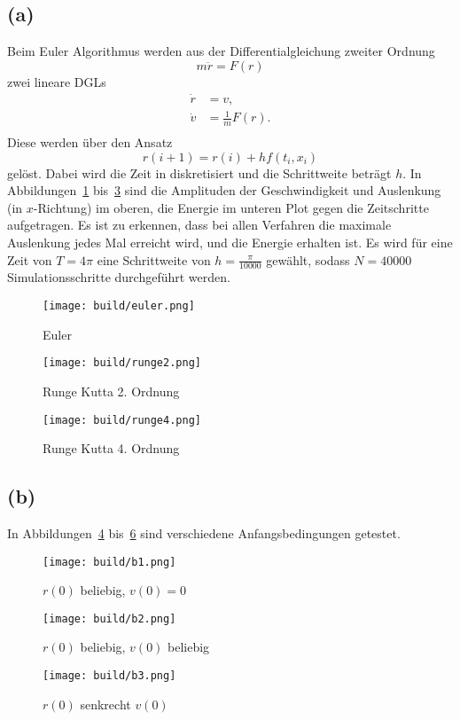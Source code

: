 \documentclass{scrartcl}
\begin{document}
\subsection*{(a)}
Beim Euler Algorithmus werden aus der Differentialgleichung zweiter Ordnung
\begin{equation}
  m \ddot{r} = F(r)
\end{equation}
zwei lineare DGLs
\begin{eqnarray}
  \dot{r} &= v,  \\
  \dot{v} &= \frac{1}{m} F(r). \\
\end{eqnarray}
Diese werden über den Ansatz
\begin{equation}
  r(i+1) = r(i) + h f(t_i, x_i)
\end{equation}
gelöst. Dabei wird die Zeit in diskretisiert und die Schrittweite
beträgt $h$.
In Abbildungen~\ref{fig:euler} bis~\ref{fig:rk4}
sind die Amplituden der Geschwindigkeit und Auslenkung (in $x$-Richtung) im oberen, die Energie im unteren Plot gegen die Zeitschritte aufgetragen.
Es ist zu erkennen, dass bei allen Verfahren die maximale Auslenkung jedes Mal erreicht wird, und
die Energie erhalten ist.
Es wird für eine Zeit von $T = 4\pi$ eine Schrittweite von $h = \frac{\pi}{10000}$ gewählt,
sodass $N = 40000$ Simulationsschritte durchgeführt werden.
\begin{figure}[ht]
  \centering
  \texttt{[image: build/euler.png]}
  \caption{Euler}%
  \label{fig:euler}
\end{figure}
\begin{figure}[ht]
  \centering
  \texttt{[image: build/runge2.png]}
  \caption{Runge Kutta 2. Ordnung}%
  \label{fig:rk2}
\end{figure}
\begin{figure}[ht]
  \centering
  \texttt{[image: build/runge4.png]}
  \caption{Runge Kutta 4. Ordnung}%
  \label{fig:rk4}
\end{figure}
\subsection*{(b)}
In Abbildungen~\ref{fig:b1} bis~\ref{fig:b3} sind verschiedene Anfangsbedingungen getestet.
\begin{figure}[ht]
  \centering
  \texttt{[image: build/b1.png]}
  \caption{$r(0)$ beliebig, $v(0) = 0$}%
  \label{fig:b1}
\end{figure}
\begin{figure}[ht]
  \centering
  \texttt{[image: build/b2.png]}
  \caption{$r(0)$ beliebig, $v(0)$ beliebig}%
  \label{fig:b2}
\end{figure}
\begin{figure}[ht]
  \centering
  \texttt{[image: build/b3.png]}
  \caption{$r(0)$ senkrecht $v(0)$}%
  \label{fig:b3}
\end{figure}
\end{document}
